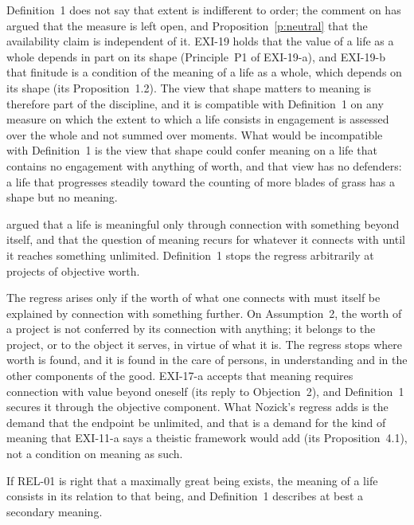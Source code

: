 \begin{reply}
Definition~1 does not say that extent is indifferent to order; the comment on  has argued that the measure is left open, and Proposition~\ref{p:neutral} that the availability claim is independent of it. EXI-19 holds that the value of a life as a whole depends in part on its shape (Principle~P1 of EXI-19-a), and EXI-19-b that finitude is a condition of the meaning of a life as a whole, which depends on its shape (its Proposition~1.2). The view that shape matters to meaning is therefore part of the discipline, and it is compatible with Definition~1 on any measure on which the extent to which a life consists in engagement is assessed over the whole and not summed over moments. What would be incompatible with Definition~1 is the view that shape could confer meaning on a life that contains no engagement with anything of worth, and that view has no defenders: a life that progresses steadily toward the counting of more blades of grass has a shape but no meaning.
\end{reply}

\begin{objection}[Transcendence]\label{o:transc}
\citet{Nozick1981} argued that a life is meaningful only through connection with something beyond itself, and that the question of meaning recurs for whatever it connects with until it reaches something unlimited. Definition~1 stops the regress arbitrarily at projects of objective worth.
\end{objection}

\begin{reply}
The regress arises only if the worth of what one connects with must itself be explained by connection with something further. On Assumption~2, the worth of a project is not conferred by its connection with anything; it belongs to the project, or to the object it serves, in virtue of what it is. The regress stops where worth is found, and it is found in the care of persons, in understanding and in the other components of the good. EXI-17-a accepts that meaning requires connection with value beyond oneself (its reply to Objection~2), and Definition~1 secures it through the objective component. What Nozick's regress adds is the demand that the endpoint be unlimited, and that is a demand for the kind of meaning that EXI-11-a says a theistic framework would add (its Proposition~4.1), not a condition on meaning as such.
\end{reply}

\begin{objection}[Theism]\label{o:theism}
If REL-01 is right that a maximally great being exists, the meaning of a life consists in its relation to that being, and Definition~1 describes at best a secondary meaning.
\end{objection}

